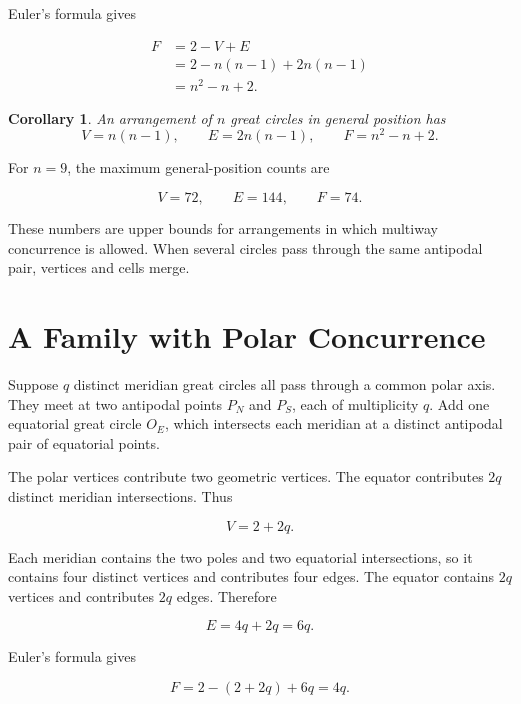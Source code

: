 \documentclass[11pt,fleqn]{book}
\numberwithin{equation}{chapter}
\theoremstyle{plain}
\newtheorem{corollary}[theorem]{Corollary}
\theoremstyle{definition}
\theoremstyle{remark}
\begin{document}
Euler's formula gives

\begin{align}
    F
    &=
    2-V+E
    \\
    &=
    2-n(n-1)+2n(n-1)
    \\
    &=
    n^2-n+2.
\end{align}

\begin{corollary}
An arrangement of \(n\) great circles in general position has
\[
V=n(n-1),
\qquad
E=2n(n-1),
\qquad
F=n^2-n+2.
\]
\end{corollary}

For \(n=9\), the maximum general-position counts are

\begin{equation}
    V=72,
    \qquad
    E=144,
    \qquad
    F=74.
\end{equation}

These numbers are upper bounds for arrangements in which multiway concurrence is allowed. When several circles pass through the same antipodal pair, vertices and cells merge.

\section{A Family with Polar Concurrence}

Suppose \(q\) distinct meridian great circles all pass through a common polar axis. They meet at two antipodal points \(P_N\) and \(P_S\), each of multiplicity \(q\). Add one equatorial great circle \(O_E\), which intersects each meridian at a distinct antipodal pair of equatorial points.

The polar vertices contribute two geometric vertices. The equator contributes \(2q\) distinct meridian intersections. Thus

\begin{equation}
    V=2+2q.
\end{equation}

Each meridian contains the two poles and two equatorial intersections, so it contains four distinct vertices and contributes four edges. The equator contains \(2q\) vertices and contributes \(2q\) edges. Therefore

\begin{equation}
    E=4q+2q=6q.
\end{equation}

Euler's formula gives

\begin{equation}
    F
    =
    2-(2+2q)+6q
    =
    4q.
\end{equation}
\end{document}
